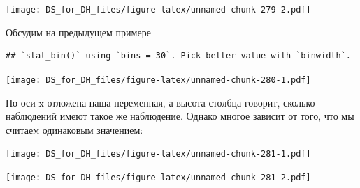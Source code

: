 \documentclass[
]{book}
\newenvironment{Shaded}{\begin{snugshade}}{\end{snugshade}}
\newcommand{\DataTypeTok}[1]{\textcolor[rgb]{0.13,0.29,0.53}{#1}}
\newcommand{\DecValTok}[1]{\textcolor[rgb]{0.00,0.00,0.81}{#1}}
\newcommand{\KeywordTok}[1]{\textcolor[rgb]{0.13,0.29,0.53}{\textbf{#1}}}
\newcommand{\NormalTok}[1]{#1}
\newcommand{\OperatorTok}[1]{\textcolor[rgb]{0.81,0.36,0.00}{\textbf{#1}}}
\newcommand{\StringTok}[1]{\textcolor[rgb]{0.31,0.60,0.02}{#1}}
\begin{document}
\texttt{[image: DS\_for\_DH\_files/figure-latex/unnamed-chunk-279-2.pdf]}

Обсудим на предыдущем примере

\begin{Shaded}
\end{Shaded}

\begin{verbatim}
## `stat_bin()` using `bins = 30`. Pick better value with `binwidth`.
\end{verbatim}

\texttt{[image: DS\_for\_DH\_files/figure-latex/unnamed-chunk-280-1.pdf]}

По оси x отложена наша переменная, а высота столбца говорит, сколько наблюдений имеют такое же наблюдение. Однако многое зависит от того, что мы считаем одинаковым значением:

\begin{Shaded}
\end{Shaded}

\texttt{[image: DS\_for\_DH\_files/figure-latex/unnamed-chunk-281-1.pdf]}

\begin{Shaded}
\end{Shaded}

\texttt{[image: DS\_for\_DH\_files/figure-latex/unnamed-chunk-281-2.pdf]}
\end{document}
